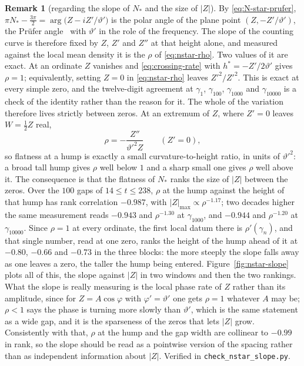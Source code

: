 \documentclass[11pt]{article}
\theoremstyle{definition}
\newtheorem{remark}[theorem]{Remark}
\begin{document}
\begin{remark}[regarding the slope of $N_{\ast}$ and the size of $|Z|$]
\label{rem:nstar-slope}
By \eqref{eq:N-star-prufer},
$\pi N_{\ast}-\tfrac{3\pi}{2}=\arg\bigl(Z-iZ'/\vartheta'\bigr)$ is the polar angle
of the plane point $(Z,-Z'/\vartheta')$, the Pr\"ufer
angle~\cite{Prufer1926} with $\vartheta'$ in the role of the frequency. The slope of
the counting curve is therefore fixed by $Z$, $Z'$ and $Z''$ at that height
alone, and measured against the local mean density it is the
$\rho$ of \eqref{eq:nstar-rho}. Two values of it are exact. At an ordinate $Z$ vanishes and
\eqref{eq:crossing-rate} with $h^{\ast}=-Z'/2\vartheta'$ gives $\rho=1$;
equivalently, setting $Z=0$ in \eqref{eq:nstar-rho} leaves $Z'^2/Z'^2$. This is
exact at every simple zero, and the twelve-digit agreement at $\gamma_1$,
$\gamma_{100}$, $\gamma_{1000}$ and $\gamma_{10000}$ is a check of the identity
rather than the reason for it. The whole of the variation therefore lives
strictly between zeros. At an extremum of $Z$, where $Z'=0$ leaves $W=\tfrac12 Z$ real,
\begin{equation}\label{eq:rho-peak}
\rho=-\frac{Z''}{\vartheta'^2 Z}\qquad(Z'=0),
\end{equation}
so flatness at a hump is exactly a small curvature-to-height ratio, in units of
$\vartheta'^2$: a broad tall hump gives $\rho$ well below $1$ and a sharp small one
gives $\rho$ well above it. The consequence is that the flatness of
$N_{\ast}$ ranks the size of $|Z|$ between the zeros. Over the $100$ gaps of
$14\leq t\leq238$, $\rho$ at the hump against the height of that hump has rank
correlation $-0.987$, with $|Z|_{\max}\propto\rho^{-1.17}$; two decades higher
the same measurement reads $-0.943$ and $\rho^{-1.30}$ at
$\gamma_{1000}$, and $-0.944$ and $\rho^{-1.20}$ at $\gamma_{10000}$. Since
$\rho=1$ at every ordinate, the first local datum there is $\rho'(\gamma_n)$,
and that single number, read at one zero, ranks the height of the hump ahead of
it at $-0.80$, $-0.66$ and $-0.73$ in the three blocks: the more steeply the
slope falls away as one leaves a zero, the taller the hump being entered.
Figure~\ref{fig:nstar-slope} plots all of this, the slope against $|Z|$ in two
windows and then the two rankings. What the slope is really
measuring is the local phase rate of $Z$ rather than its amplitude, since for
$Z=A\cos\varphi$ with $\varphi'=\vartheta'$ one gets $\rho=1$ whatever $A$ may be;
$\rho<1$ says the phase is turning more slowly than $\vartheta'$, which is the same
statement as a wide gap, and it is the sparseness of the zeros that lets $|Z|$
grow. Consistently with that, $\rho$ at the hump and the gap width are
collinear to $-0.99$ in rank, so the slope should be read as a pointwise
version of the spacing rather than as independent information about $|Z|$.
Verified in \texttt{check\_nstar\_slope.py}.
\end{remark}
\end{document}
